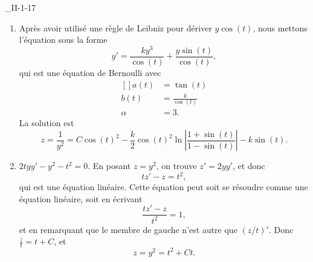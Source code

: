 \begin{corrige}{_II-1-17}
\begin{enumerate}
		\item
		      Après avoir utilisé une règle de Leibniz pour dériver $y\cos(t)$, nous mettons l'équation sous la forme
		      \begin{equation}
			      y'=\frac{ ky^3 }{ \cos(t) }+\frac{ y\sin(t) }{ \cos(t) },
		      \end{equation}
		      qui est une équation de Bernoulli avec
		      \begin{equation}
			      \begin{aligned}[]
				      a(t)   & =\tan(t)               \\
				      b(t)   & =\frac{ k }{ \cos(t) } \\
				      \alpha & =3.
			      \end{aligned}
		      \end{equation}
		      La solution est
		      \begin{equation}
			      z=\frac{1}{ y^2 }=C\cos(t)^2-\frac{ k }{2}\cos(t)^2\ln\left| \frac{ 1+\sin(t) }{ 1-\sin(t) } \right| -k\sin(t).
		      \end{equation}

		\item
		      $2tyy'-y^2-t^2=0$. En posant $z=y^2$, on trouve $z'=2yy'$, et donc
		      \begin{equation}
			      tz'-z=t^2,
		      \end{equation}
		      qui est une équation linéaire. Cette équation peut soit se résoudre comme une équation linéaire, soit en écrivant
		      \begin{equation}
			      \frac{ tz'-z }{ t^2 }=1,
		      \end{equation}
		      et en remarquant que le membre de gauche n'est autre que $(z/t)'$. Donc $\frac{ z }{ t }=t+C$, et
		      \begin{equation}
			      z=y^2=t^2+Ct.
		      \end{equation}


\end{enumerate}
\end{corrige}
